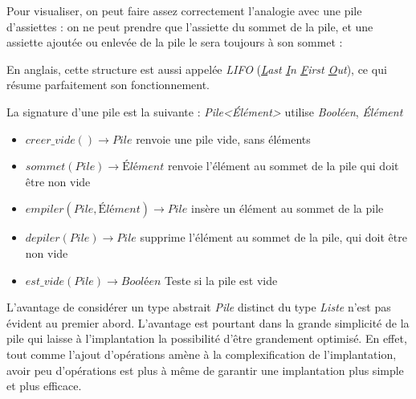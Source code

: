 \documentclass[../../../main.tex]{subfiles}
\begin{document}
Pour visualiser, on peut faire assez correctement l'analogie avec une pile d'assiettes : on ne peut prendre que l'assiette du sommet de la pile, et une assiette ajoutée ou enlevée de la pile le sera toujours à son sommet :

\begin{minipage}{\textwidth}
	\begin{center}
		
	\end{center}
\end{minipage}

En anglais, cette structure est aussi appelée \textit{LIFO} (\textit{\underline{L}ast \underline{I}n \underline{F}irst \underline{O}ut}), ce qui résume parfaitement son fonctionnement.

La signature d'une pile est la suivante :
\textit{Pile\textless Élément\textgreater} utilise \textit{Booléen}, \textit{Élément}
\begin{itemize}
	\item $creer\_vide()\rightarrow Pile$ renvoie une pile vide, sans éléments
	\item $sommet(Pile)\rightarrow \textit{Élément}$ renvoie l'élément au sommet de la pile qui doit être non vide
	\item $empiler(Pile, \textit{Élément}) \rightarrow Pile$ insère un élément au sommet de la pile
	\item $depiler(Pile)\rightarrow Pile$ supprime l'élément au sommet de la pile, qui doit être non vide
	\item $est\_vide(Pile)\rightarrow \textit{Booléen}$ Teste si la pile est vide
\end{itemize}

L'avantage de considérer un type abstrait \textit{Pile} distinct du type \textit{Liste} n'est pas évident au premier abord. L'avantage est pourtant dans la grande simplicité de la pile qui laisse à l'implantation la possibilité d'être grandement optimisé. En effet, tout comme l'ajout d'opérations amène à la complexification de l'implantation, avoir peu d'opérations est plus à même de garantir une implantation plus simple et plus efficace.
\end{document}
